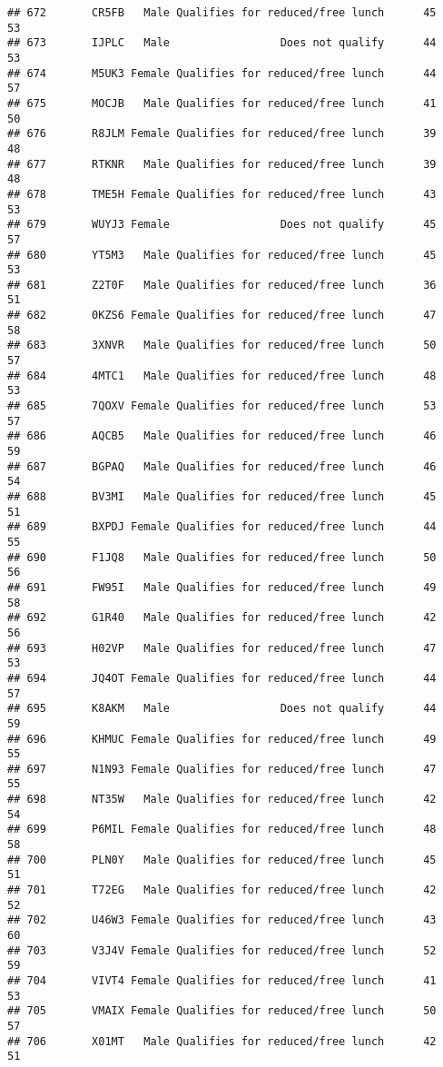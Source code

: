 \documentclass[
]{article}
\begin{document}
\begin{verbatim}
## 672       CR5FB   Male Qualifies for reduced/free lunch      45       53
## 673       IJPLC   Male                 Does not qualify      44       53
## 674       M5UK3 Female Qualifies for reduced/free lunch      44       57
## 675       MOCJB   Male Qualifies for reduced/free lunch      41       50
## 676       R8JLM Female Qualifies for reduced/free lunch      39       48
## 677       RTKNR   Male Qualifies for reduced/free lunch      39       48
## 678       TME5H Female Qualifies for reduced/free lunch      43       53
## 679       WUYJ3 Female                 Does not qualify      45       57
## 680       YT5M3   Male Qualifies for reduced/free lunch      45       53
## 681       Z2T0F   Male Qualifies for reduced/free lunch      36       51
## 682       0KZS6 Female Qualifies for reduced/free lunch      47       58
## 683       3XNVR   Male Qualifies for reduced/free lunch      50       57
## 684       4MTC1   Male Qualifies for reduced/free lunch      48       53
## 685       7QOXV Female Qualifies for reduced/free lunch      53       57
## 686       AQCB5   Male Qualifies for reduced/free lunch      46       59
## 687       BGPAQ   Male Qualifies for reduced/free lunch      46       54
## 688       BV3MI   Male Qualifies for reduced/free lunch      45       51
## 689       BXPDJ Female Qualifies for reduced/free lunch      44       55
## 690       F1JQ8   Male Qualifies for reduced/free lunch      50       56
## 691       FW95I   Male Qualifies for reduced/free lunch      49       58
## 692       G1R40   Male Qualifies for reduced/free lunch      42       56
## 693       H02VP   Male Qualifies for reduced/free lunch      47       53
## 694       JQ4OT Female Qualifies for reduced/free lunch      44       57
## 695       K8AKM   Male                 Does not qualify      44       59
## 696       KHMUC Female Qualifies for reduced/free lunch      49       55
## 697       N1N93 Female Qualifies for reduced/free lunch      47       55
## 698       NT35W   Male Qualifies for reduced/free lunch      42       54
## 699       P6MIL Female Qualifies for reduced/free lunch      48       58
## 700       PLN0Y   Male Qualifies for reduced/free lunch      45       51
## 701       T72EG   Male Qualifies for reduced/free lunch      42       52
## 702       U46W3 Female Qualifies for reduced/free lunch      43       60
## 703       V3J4V Female Qualifies for reduced/free lunch      52       59
## 704       VIVT4 Female Qualifies for reduced/free lunch      41       53
## 705       VMAIX Female Qualifies for reduced/free lunch      50       57
## 706       X01MT   Male Qualifies for reduced/free lunch      42       51

\end{verbatim}
\end{document}
